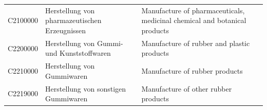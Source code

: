 \begin{longtable}{|p{3cm}|p{6cm}|p{6cm}|}
 C2100000   & Herstellung von pharmazeutischen Erzeugnissen   & Manufacture of pharmaceuticals, medicinal chemical and botanical products    \\
 C2200000   & Herstellung von Gummi- und Kunststoffwaren   & Manufacture of rubber and plastic products    \\
 C2210000   & Herstellung von Gummiwaren   & Manufacture of rubber products    \\
 C2219000   & Herstellung von sonstigen Gummiwaren   & Manufacture of other rubber products    \\
\hline
\end{longtable}

